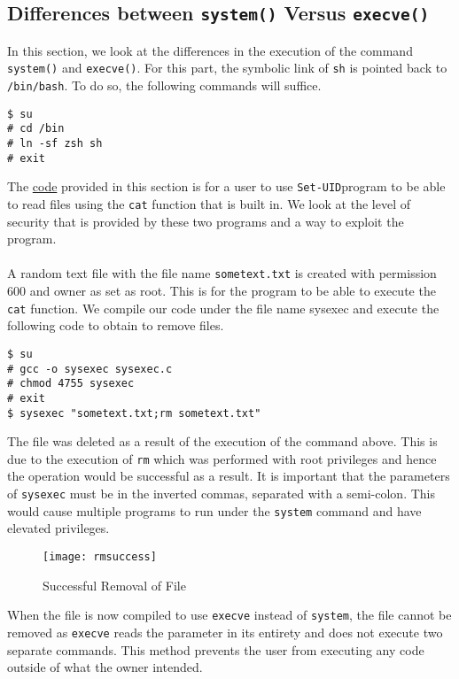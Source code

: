 \documentclass[a4paper,12pt]{article}
\newcommand{\setuid}{\texttt{Set-UID}}
\begin{document}
\subsection{Differences between \texttt{system()} Versus \texttt{execve()}}
In this section, we look at the differences in the execution of the command \texttt{system()} and \texttt{execve()}. For this part, the symbolic link of \texttt{sh} is pointed back to \texttt{/bin/bash}. To do so, the following commands will suffice.
\begin{verbatim}
$ su
# cd /bin
# ln -sf zsh sh
# exit
\end{verbatim}
The \hyperref[Appsec:sysexec]{code} provided in this section is for a user to use \setuid program to be able to read files using the \texttt{cat} function that is built in. We look at the level of security that is provided by these two programs and a way to exploit the program.\\\\A random text file with the file name \texttt{sometext.txt} is created with permission 600 and owner as set as root. This is for the program to be able to execute the \texttt{cat} function. We compile our code under the file name sysexec and execute the following code to obtain to remove files.
\begin{verbatim}
$ su
# gcc -o sysexec sysexec.c
# chmod 4755 sysexec
# exit
$ sysexec "sometext.txt;rm sometext.txt"
\end{verbatim}
The file was deleted as a result of the execution of the command above. This is due to the execution of \texttt{rm} which was performed with root privileges and hence the operation would be successful as a result. It is important that the parameters of \texttt{sysexec} must be in the inverted commas, separated with a semi-colon. This would cause multiple programs to run under the \texttt{system} command and have elevated privileges.
\begin{figure}[H]
	\centering
	\texttt{[image: rmsuccess]}
	\caption{Successful Removal of File}
	\label{fig:rmsuccess}
\end{figure}
\noindent When the file is now compiled to use \texttt{execve} instead of \texttt{system}, the file cannot be removed as \texttt{execve} reads the parameter in its entirety and does not execute two separate commands. This method prevents the user from executing any code outside of what the owner intended.
\end{document}
